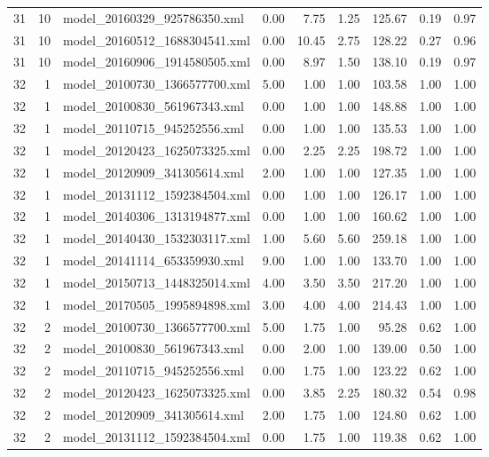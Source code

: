 \begin{table}[ht]
\begin{tabular}{rrlrrrrrr}
   31 &  10 & model\_20160329\_925786350.xml & 0.00 & 7.75 & 1.25 & 125.67 & 0.19 & 0.97 \\ 
   31 &  10 & model\_20160512\_1688304541.xml & 0.00 & 10.45 & 2.75 & 128.22 & 0.27 & 0.96 \\ 
   31 &  10 & model\_20160906\_1914580505.xml & 0.00 & 8.97 & 1.50 & 138.10 & 0.19 & 0.97 \\ 
   32 &   1 & model\_20100730\_1366577700.xml & 5.00 & 1.00 & 1.00 & 103.58 & 1.00 & 1.00 \\ 
   32 &   1 & model\_20100830\_561967343.xml & 0.00 & 1.00 & 1.00 & 148.88 & 1.00 & 1.00 \\ 
   32 &   1 & model\_20110715\_945252556.xml & 0.00 & 1.00 & 1.00 & 135.53 & 1.00 & 1.00 \\ 
   32 &   1 & model\_20120423\_1625073325.xml & 0.00 & 2.25 & 2.25 & 198.72 & 1.00 & 1.00 \\ 
   32 &   1 & model\_20120909\_341305614.xml & 2.00 & 1.00 & 1.00 & 127.35 & 1.00 & 1.00 \\ 
   32 &   1 & model\_20131112\_1592384504.xml & 0.00 & 1.00 & 1.00 & 126.17 & 1.00 & 1.00 \\ 
   32 &   1 & model\_20140306\_1313194877.xml & 0.00 & 1.00 & 1.00 & 160.62 & 1.00 & 1.00 \\ 
   32 &   1 & model\_20140430\_1532303117.xml & 1.00 & 5.60 & 5.60 & 259.18 & 1.00 & 1.00 \\ 
   32 &   1 & model\_20141114\_653359930.xml & 9.00 & 1.00 & 1.00 & 133.70 & 1.00 & 1.00 \\ 
   32 &   1 & model\_20150713\_1448325014.xml & 4.00 & 3.50 & 3.50 & 217.20 & 1.00 & 1.00 \\ 
   32 &   1 & model\_20170505\_1995894898.xml & 3.00 & 4.00 & 4.00 & 214.43 & 1.00 & 1.00 \\ 
   32 &   2 & model\_20100730\_1366577700.xml & 5.00 & 1.75 & 1.00 & 95.28 & 0.62 & 1.00 \\ 
   32 &   2 & model\_20100830\_561967343.xml & 0.00 & 2.00 & 1.00 & 139.00 & 0.50 & 1.00 \\ 
   32 &   2 & model\_20110715\_945252556.xml & 0.00 & 1.75 & 1.00 & 123.22 & 0.62 & 1.00 \\ 
   32 &   2 & model\_20120423\_1625073325.xml & 0.00 & 3.85 & 2.25 & 180.32 & 0.54 & 0.98 \\ 
   32 &   2 & model\_20120909\_341305614.xml & 2.00 & 1.75 & 1.00 & 124.80 & 0.62 & 1.00 \\ 
   32 &   2 & model\_20131112\_1592384504.xml & 0.00 & 1.75 & 1.00 & 119.38 & 0.62 & 1.00 \\ 

\end{tabular}
\end{table}
